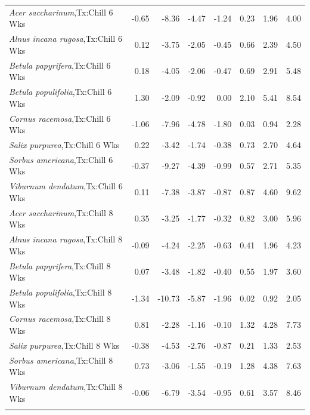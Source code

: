 \documentclass{article}\usepackage[]{graphicx}\usepackage[]{color}
\begin{document}
\begin{longtable}{lrrrrrrr}
  \textit{Acer saccharinum},Tx:Chill 6 Wks & -0.65 & -8.36 & -4.47 & -1.24 & 0.23 & 1.96 & 4.00 \\ 
  \textit{Alnus incana rugosa},Tx:Chill 6 Wks & 0.12 & -3.75 & -2.05 & -0.45 & 0.66 & 2.39 & 4.50 \\ 
  \textit{Betula papyrifera},Tx:Chill 6 Wks & 0.18 & -4.05 & -2.06 & -0.47 & 0.69 & 2.91 & 5.48 \\ 
  \textit{Betula populifolia},Tx:Chill 6 Wks & 1.30 & -2.09 & -0.92 & 0.00 & 2.10 & 5.41 & 8.54 \\ 
  \textit{Cornus racemosa},Tx:Chill 6 Wks & -1.06 & -7.96 & -4.78 & -1.80 & 0.03 & 0.94 & 2.28 \\ 
  \textit{Salix purpurea},Tx:Chill 6 Wks & 0.22 & -3.42 & -1.74 & -0.38 & 0.73 & 2.70 & 4.64 \\ 
  \textit{Sorbus americana},Tx:Chill 6 Wks & -0.37 & -9.27 & -4.39 & -0.99 & 0.57 & 2.71 & 5.35 \\ 
  \textit{Viburnum dendatum},Tx:Chill 6 Wks & 0.11 & -7.38 & -3.87 & -0.87 & 0.87 & 4.60 & 9.62 \\ 
  \textit{Acer saccharinum},Tx:Chill 8 Wks & 0.35 & -3.25 & -1.77 & -0.32 & 0.82 & 3.00 & 5.96 \\ 
  \textit{Alnus incana rugosa},Tx:Chill 8 Wks & -0.09 & -4.24 & -2.25 & -0.63 & 0.41 & 1.96 & 4.23 \\ 
  \textit{Betula papyrifera},Tx:Chill 8 Wks & 0.07 & -3.48 & -1.82 & -0.40 & 0.55 & 1.97 & 3.60 \\ 
  \textit{Betula populifolia},Tx:Chill 8 Wks & -1.34 & -10.73 & -5.87 & -1.96 & 0.02 & 0.92 & 2.05 \\ 
  \textit{Cornus racemosa},Tx:Chill 8 Wks & 0.81 & -2.28 & -1.16 & -0.10 & 1.32 & 4.28 & 7.73 \\ 
  \textit{Salix purpurea},Tx:Chill 8 Wks & -0.38 & -4.53 & -2.76 & -0.87 & 0.21 & 1.33 & 2.53 \\ 
  \textit{Sorbus americana},Tx:Chill 8 Wks & 0.73 & -3.06 & -1.55 & -0.19 & 1.28 & 4.38 & 7.63 \\ 
  \textit{Viburnum dendatum},Tx:Chill 8 Wks & -0.06 & -6.79 & -3.54 & -0.95 & 0.61 & 3.57 & 8.46 \\ 
   \hline
\hline
\label{tab:suppmodmeri}
\end{longtable}
\end{document}
